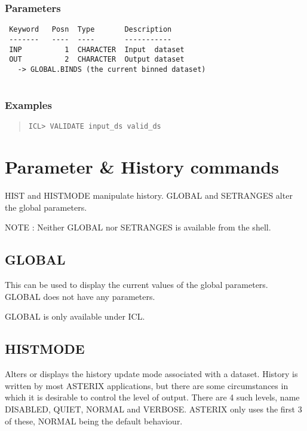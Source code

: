 \documentclass{book}
\renewcommand{\_}{{\tt\char'137}}     %
\begin{document}
\subsection{Parameters}
\begin{verbatim}
 Keyword   Posn  Type       Description
 -------   ----  ----       -----------
 INP          1  CHARACTER  Input  dataset
 OUT          2  CHARACTER  Output dataset
   -> GLOBAL.BINDS (the current binned dataset)
 
\end{verbatim}\subsection{Examples}
\begin{quote}\begin{verbatim}
ICL> VALIDATE input_ds valid_ds
\end{verbatim}\end{quote}
\chapter{Parameter \& History commands}
HIST and HISTMODE manipulate history. GLOBAL and SETRANGES
alter the global parameters.
 
NOTE : Neither GLOBAL nor SETRANGES is available from the shell.
 
\section{GLOBAL}
This can be used to display the current values of the global
parameters. GLOBAL does not have any parameters.
 
GLOBAL is only available under ICL.
 
\section{HISTMODE}
Alters or displays the history update mode associated with
a dataset. History is written by most ASTERIX applications,
but there are some circumstances in which it is desirable
to control the level of output. There are 4 such levels,
name DISABLED, QUIET, NORMAL and VERBOSE. ASTERIX only uses
the first 3 of these, NORMAL being the default behaviour.
 
\end{document}

